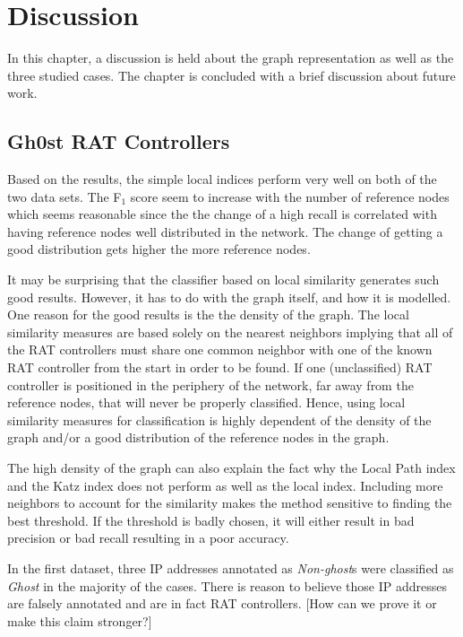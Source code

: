 \chapter{Discussion}
In this chapter, a discussion is held about the graph representation as well as the three studied cases. The chapter is concluded with a brief discussion about future work.

\section{Gh0st RAT Controllers}
Based on the results, the simple local indices perform very well on both of the two data sets. The F$_1$ score seem to increase with the number of reference nodes which seems reasonable since the the change of a high recall is correlated with having reference nodes well distributed in the network. The change of getting a good distribution gets higher the more reference nodes. 

It may be surprising that the classifier based on local similarity generates such good results. However, it has to do with the graph itself, and how it is modelled. One reason for the good results is the the density of the graph. The local similarity measures are based solely on the nearest neighbors implying that all of the RAT controllers must share one common neighbor with one of the known RAT controller from the start in order to be found. If one (unclassified) RAT controller is positioned in the periphery of the network, far away from the reference nodes, that will never be properly classified. Hence, using local similarity measures for classification is highly dependent of the density of the graph and/or a good distribution of the reference nodes in the graph. 

The high density of the graph can also explain the fact why the Local Path index and the Katz index does not perform as well as the local index. Including more neighbors to account for the similarity makes the method sensitive to finding the best threshold. If the threshold is badly chosen, it will either result in bad precision or bad recall resulting in a poor accuracy.

In the first dataset, three IP addresses annotated as \textit{Non-ghost}s were classified as \textit{Ghost} in the majority of the cases. There is reason to believe those IP addresses are falsely annotated and are in fact RAT controllers. [How can we prove it or make this claim stronger?]

